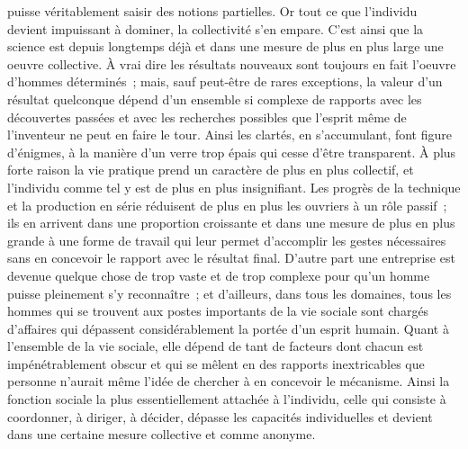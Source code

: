 \documentclass[french,twoside]{book} %
\begin{document}
puisse véritablement saisir des notions partielles. Or tout ce que l'individu devient impuissant à dominer, la collectivité s'en empare. C'est ainsi que la science est depuis longtemps déjà et dans une mesure de plus en plus large une oeuvre collective. À vrai dire les résultats nouveaux sont toujours en fait l'oeuvre d'hommes déterminés ; mais, sauf peut-être de rares exceptions, la valeur d'un résultat quelconque dépend d'un ensemble si complexe de rapports avec les découvertes passées et avec les recherches possibles que l'esprit même de l'inventeur ne peut en faire le tour. Ainsi les clartés, en s'accumulant, font figure d'énigmes, à la manière d'un verre trop épais qui cesse d'être transparent. À plus forte raison la vie pratique prend un caractère de plus en plus collectif, et l'individu comme tel y est de plus en plus insignifiant. Les progrès de la technique et la production en série réduisent de plus en plus les ouvriers à un rôle passif ; ils en arrivent dans une proportion croissante et dans une mesure de plus en plus grande à une forme de travail qui leur permet d'accomplir les gestes nécessaires sans en concevoir le rapport avec le résultat final. D'autre part une entreprise est devenue quelque chose de trop vaste et de trop complexe pour qu'un homme puisse pleinement s'y reconnaître ; et d'ailleurs, dans tous les domaines, tous les hommes qui se trouvent aux postes importants de la vie sociale sont chargés d'affaires qui dépassent considérablement la portée d'un esprit humain. Quant à l'ensemble de la vie sociale, elle dépend de tant de facteurs dont chacun est impénétrablement obscur et qui se mêlent en des rapports inextricables que personne n'aurait même l'idée de chercher à en concevoir le mécanisme. Ainsi la fonction sociale la plus essentiellement attachée à l'individu, celle qui consiste à coordonner, à diriger, à décider, dépasse les capacités individuelles et devient dans une certaine mesure collective et comme anonyme.\par
\end{document}
